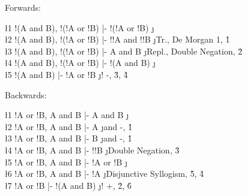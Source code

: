 \documentclass[class=cs245,notes,leqno]{agony}
\begin{document}
\begin{theorem}[De Morgan 2]
\end{theorem}
\begin{prf}
  Forwards:
  \begin{deduce}
    \l1 !(A and B), !(!A or !B) |- !(!A or !B) \j {\E}                          \\
    \l2 !(A and B), !(!A or !B) |- !!A and !!B \j {Tr., De Morgan 1, \r1}       \\
    \l3 !(A and B), !(!A or !B) |- A and B     \j {Repl., Double Negation, \r2} \\
    \l4 !(A and B), !(!A or !B) |- !(A and B)  \j {\E}                          \\
    \l5 !(A and B)              |- !A or !B    \j {! -, \r3, \r4}
  \end{deduce}
  Backwards:
  \begin{deduce}
    \l1 !A or !B, A and B |- A and B    \j {\E}                              \\
    \l2 !A or !B, A and B |- A          \j {and -, \r1}                      \\
    \l3 !A or !B, A and B |- B          \j {and -, \r1}                      \\
    \l4 !A or !B, A and B |- !!B        \j {Double Negation, \r3}            \\
    \l5 !A or !B, A and B |- !A or !B   \j {\E}                              \\
    \l6 !A or !B, A and B |- !A         \j {Disjunctive Syllogism, \r5, \r4} \\
    \l7 !A or !B          |- !(A and B) \j {! +, \r2, \r6}
  \end{deduce}
\end{prf}
\end{document}
